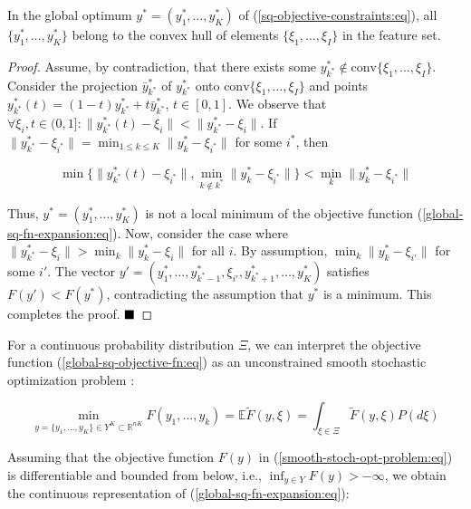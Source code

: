 \begin{lemma}
    \label{Lemma 1} In the global optimum $y^* = (y_1^*, \ldots, y_K^*)$ of (\ref{sq-objective-constraints:eq}), all $\{y_1^*, \ldots, y_K^*\}$ belong to the convex hull of elements $\{\xi_1, \ldots, \xi_I\}$ in the feature set.
\end{lemma}
\begin{proof}
    Assume, by contradiction, that there exists some $y_{k^*}^* \notin \text{conv}\{\xi_1, \ldots, \xi_I\}$. Consider the projection $\bar{y}_{k^*}^*$ of $y_{k^*}^*$ onto $\text{conv}\{\xi_1, \ldots, \xi_I\}$ and points $y_{k^*}^*(t) = (1 - t)y_{k^*}^* + t\bar{y}_{k^*}^*$, $t \in [0, 1]$. We observe that $\forall \xi_i, t \in (0, 1]: \|y_{k^*}^*(t) - \xi_i\| < \|y_{k^*}^* - \xi_i\|$. If $\|y_{k^*}^* - \xi_{i^*}\| = \min_{1 \leq k \leq K} \|y_k^* - \xi_{i^*}\|$ for some $i^*$, then

    \begin{equation}
        \min\{\| y_{k^*}^*(t) - \xi_{i^*} \|, \min_{k \notin k^*} \| y_k^* - \xi_{i^*} \|\} < \min_k \| y_k^* - \xi_{i^*} \|
    \end{equation}

    \noindent Thus, $y^* = (y_1^*, \ldots, y_K^*)$ is not a local minimum of the objective function (\ref{global-sq-fn-expansion:eq}). Now, consider the case where $ \| y_{k^*}^* - \xi_i \| > \min_k \| y_k^* - \xi_i \|$ for all $i$. By assumption, $\min_k \| y_k^* - \xi_{i'} \|$ for some $i'$. The vector $y' = (y_1^*, \ldots, y_{k^* - 1}^*, \xi_{i'}, y_{k^* + 1}^*, \ldots, y_K^*)$ satisfies $F(y') < F(y^*)$, contradicting the assumption that $y^*$ is a minimum. This completes the proof. $ \qed $
\end{proof}

For a continuous probability distribution $\Xi$, we can interpret the objective function (\ref{global-sq-objective-fn:eq}) as an unconstrained smooth stochastic optimization problem \cite{ermoliev1976stochastic,Newton_Yousefian_Pasupathy_2018,Norkin_Kozyriev_Norkin_2024}:

\begin{equation}
    \label{smooth-stoch-opt-problem:eq}
        \min_{y = \{ y_1, \ldots, y_K \} \in Y^K \subset \mathbb{R}^{nK}} F(y_1, \ldots, y_k) = \mathbb{E} \tilde{F}(y, \xi) = \int_{\xi \in \Xi} \tilde{F}(y, \xi) P(d \xi)
\end{equation}

Assuming that the objective function $F(y)$ in (\ref{smooth-stoch-opt-problem:eq}) is differentiable and bounded from below, i.e., $\inf_{y \in Y} F(y) > -\infty$, we obtain the continuous representation of (\ref{global-sq-fn-expansion:eq}):


